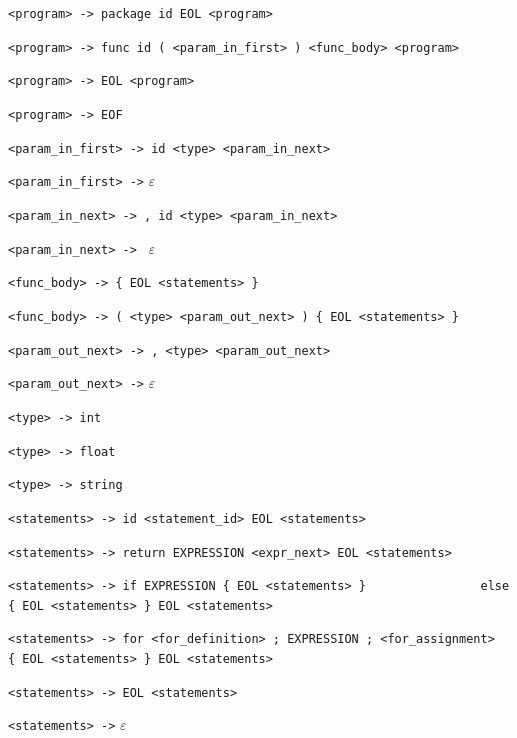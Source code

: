 \documentclass[a4paper, 12pt]{article}
\begin{document}
		\begin{enumerate}[noitemsep]
		\footnotesize{
            \item \verb|<program> -> package id EOL <program>| 
            \item \verb|<program> -> func id ( <param_in_first> ) <func_body> <program>|
            \item \verb|<program> -> EOL <program>|
            \item \verb|<program> -> EOF |
            
            \item \verb|<param_in_first> -> id <type> <param_in_next> |
            \item \verb|<param_in_first> ->| $\varepsilon$
            \item \verb|<param_in_next> -> , id <type> <param_in_next>|
            \item \verb|<param_in_next> -> | $\varepsilon$
            
            \item \verb|<func_body> -> { EOL <statements> }|
            \item \verb|<func_body> -> ( <type> <param_out_next> ) { EOL <statements> } |
            
            \item \verb|<param_out_next> -> , <type> <param_out_next> |
            \item \verb|<param_out_next> ->| $\varepsilon$
            
            \item \verb|<type> -> int|
            \item \verb|<type> -> float| 
            \item \verb|<type> -> string|
            
            \item \verb|<statements> -> id <statement_id> EOL <statements>|
            \item \verb|<statements> -> return EXPRESSION <expr_next> EOL <statements>|
            \item \verb|<statements> -> if EXPRESSION { EOL <statements> }|\newline \verb|                else { EOL <statements> } EOL <statements>|
            \item \verb|<statements> -> for <for_definition> ; EXPRESSION ; <for_assignment>|\newline \verb|                { EOL <statements> } EOL <statements>|
            \item \verb|<statements> -> EOL <statements>|
            \item \verb|<statements> ->| $\varepsilon$
            
}
\end{enumerate}
\end{document}
